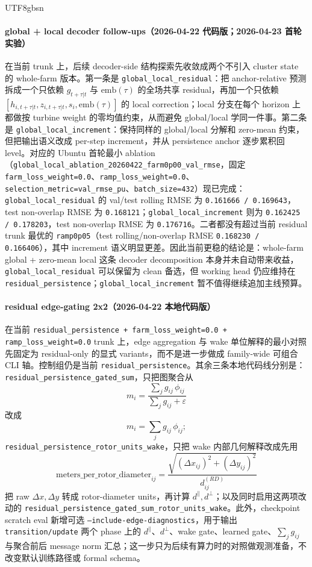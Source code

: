 \documentclass[11pt]{article}
\begin{document}
\begin{CJK}{UTF8}{gbsn}
\paragraph{global + local decoder follow-ups（2026-04-22 代码版；2026-04-23 首轮实验）}
在当前 trunk 上，后续 decoder-side 结构探索先收敛成两个不引入 cluster state 的 whole-farm 版本。第一条是 \texttt{global\_local\_residual}：把 anchor-relative 预测拆成一个只依赖 \(g_{t+\tau|t}\) 与 \(\mathrm{emb}(\tau)\) 的全场共享 residual，再加一个只依赖 \([h_{i,t+\tau|t}, z_{i,t+\tau|t}, s_i, \mathrm{emb}(\tau)]\) 的 local correction；local 分支在每个 horizon 上都做按 turbine weight 的零均值约束，从而避免 global/local 学同一件事。第二条是 \texttt{global\_local\_increment}：保持同样的 global/local 分解和 zero-mean 约束，但把输出语义改成 per-step increment，并从 persistence anchor 逐步累积回 level。对应的 Ubuntu 首轮最小 ablation（\texttt{global\_local\_ablation\_20260422\_farm0p00\_val\_rmse}，固定 \texttt{farm\_loss\_weight=0.0}、\texttt{ramp\_loss\_weight=0.0}、\texttt{selection\_metric=val\_rmse\_pu}、\texttt{batch\_size=432}）现已完成：\texttt{global\_local\_residual} 的 val/test rolling RMSE 为 \texttt{0.161666 / 0.169643}，test non-overlap RMSE 为 \texttt{0.168121}；\texttt{global\_local\_increment} 则为 \texttt{0.162425 / 0.178203}，test non-overlap RMSE 为 \texttt{0.176716}。二者都没有超过当前 residual trunk 最优的 \texttt{ramp0p05}（test rolling/non-overlap RMSE \texttt{0.168230 / 0.166406}），其中 increment 语义明显更差。因此当前更稳的结论是：whole-farm global + zero-mean local 这条 decoder decomposition 本身并未自动带来收益，\texttt{global\_local\_residual} 可以保留为 clean 备选，但 working head 仍应维持在 \texttt{residual\_persistence}；\texttt{global\_local\_increment} 暂不值得继续追加主线预算。

\paragraph{residual edge-gating 2x2（2026-04-22 本地代码版）}
在当前 \texttt{residual\_persistence + farm\_loss\_weight=0.0 + ramp\_loss\_weight=0.0} trunk 上，edge aggregation 与 wake 单位解释的最小对照先固定为 residual-only 的显式 variants，而不是进一步做成 family-wide 可组合 CLI 轴。控制组仍是当前 \texttt{residual\_persistence}。其余三条本地代码线分别是：\texttt{residual\_persistence\_gated\_sum}，只把图聚合从
\[
m_i=\frac{\sum_j g_{ij}\,\phi_{ij}}{\sum_j g_{ij}+\varepsilon}
\]
改成
\[
m_i=\sum_j g_{ij}\,\phi_{ij};
\]
\texttt{residual\_persistence\_rotor\_units\_wake}，只把 wake 内部几何解释改成先用
\[
\text{meters\_per\_rotor\_diameter}_{ij}
=
\frac{\sqrt{(\Delta x_{ij})^2 + (\Delta y_{ij})^2}}{d^{(RD)}_{ij}}
\]
把 raw \(\Delta x,\Delta y\) 转成 rotor-diameter units，再计算 \(d^{\parallel}, d^{\perp}\)；以及同时启用这两项改动的 \texttt{residual\_persistence\_gated\_sum\_rotor\_units\_wake}。此外，checkpoint scratch eval 新增可选 \texttt{--include-edge-diagnostics}，用于输出 \texttt{transition/update} 两个 phase 上的 \(d^{\parallel}\)、\(d^{\perp}\)、wake gate、learned gate、\(\sum_j g_{ij}\) 与聚合前后 message norm 汇总；这一步只为后续有算力时的对照做观测准备，不改变默认训练路径或 formal schema。


\end{CJK}
\end{document}
